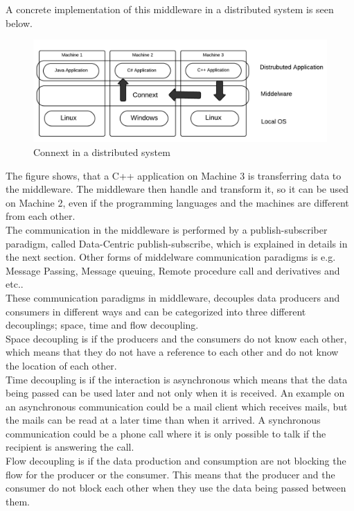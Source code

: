 \documentclass[Main]{subfiles}
\begin{document}
A concrete implementation of this middleware in a distributed system is seen below.
\begin{figure}[H]
\centering
\includegraphics[scale=0.4]{Figure/MiddelwareImplementation.png}
\caption{Connext in a distributed system}
\end{figure}

The figure shows, that a C++ application on Machine 3 is transferring data to the middleware. The middleware then handle and transform it, so it can be used on Machine 2, even if the programming languages and the machines are different from each other. 
\\
The communication in the middleware is performed by a publish-subscriber paradigm, called Data-Centric publish-subscribe, which is explained in details in the next section. Other forms of middelware communication paradigms is e.g. Message Passing, Message queuing, Remote procedure call and derivatives and etc.\cite{DDS-slides}.\\
These communication paradigms in middleware, decouples data producers and consumers in different ways and can be categorized into three different decouplings; space, time and flow decoupling.\\
Space decoupling is if the producers and the consumers do not know each other, which means that they do not have a reference to each other and do not know the location of each other.
\\
Time decoupling is if the interaction is asynchronous which means that the data being passed can be used later and not only when it is received. An example on an asynchronous communication could be a mail client which receives mails, but the mails can be read at a later time than when it arrived. A synchronous communication could be a phone call where it is only possible to talk if the recipient is answering the call. \\
Flow decoupling is if the data production and consumption are not blocking the flow for the producer or the consumer. This means that the producer and the consumer do not block each other when they use the data being passed between them.\\
\end{document}
